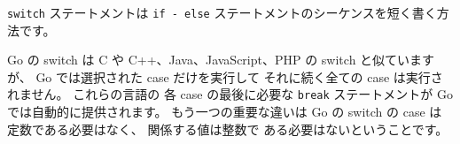 \texttt{switch} ステートメントは \texttt{if - else}
ステートメントのシーケンスを短く書く方法です。

Go の switch は C や C++、Java、JavaScript、PHP の 
switch と似ていますが、 Go では選択された case だけを実行して
それに続く全ての case は実行されません。 これらの言語の
各 case の最後に必要な \texttt{break} ステートメントが 
Go では自動的に提供されます。 もう一つの重要な違いは Go の 
switch の case は定数である必要はなく、 関係する値は整数で
ある必要はないということです。